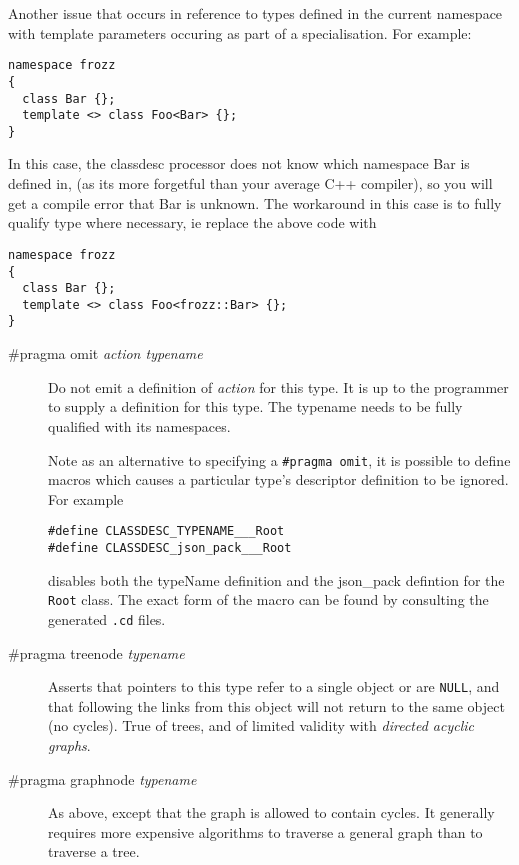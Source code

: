 Another issue that occurs in reference to types defined in the current
namespace with template parameters occuring as part of a
specialisation. For example:
\begin{verbatim}
namespace frozz
{
  class Bar {};
  template <> class Foo<Bar> {};
}
\end{verbatim}
In this case, the classdesc processor does not know which namespace
Bar is defined in, (as its more forgetful than your average C++
compiler), so you will get a compile error that Bar is unknown. The
workaround in this case is to fully qualify type where necessary, ie
replace the above code with
\begin{verbatim}
namespace frozz
{
  class Bar {};
  template <> class Foo<frozz::Bar> {};
}
\end{verbatim}



\begin{description}
\item[\#pragma omit {\em action typename}] Do not emit a definition of
{\em action} for this type. It is up to the programmer to supply a
definition for this type. The typename needs to be fully qualified
with its namespaces.

Note as an alternative to specifying a \verb+#pragma omit+, it is
possible to define macros which causes a particular type's
descriptor definition to be ignored. For example
\begin{verbatim}
#define CLASSDESC_TYPENAME___Root
#define CLASSDESC_json_pack___Root
\end{verbatim}
disables both the typeName definition and the json\_pack defintion for
the {\tt Root} class. The exact form of the macro can be found by
consulting the generated \verb+.cd+ files.

\item[\#pragma treenode {\em typename}] Asserts that pointers to this
type refer to a single object or are {\tt NULL}, and that following
the links from this object will not return to the same object (no
cycles). True of trees, and of limited validity with {\em directed
acyclic graphs}.
\item[\#pragma graphnode {\em typename}] As above, except that the
graph is allowed to contain cycles. It generally requires more
expensive algorithms to traverse a general graph than to traverse a tree.
\end{description}

